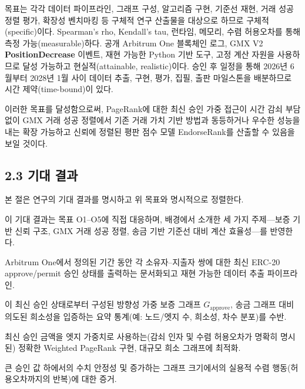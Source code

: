 목표는 각각 데이터 파이프라인, 그래프 구성, 알고리즘 구현, 기준선 재현, 거래 성공 정렬 평가, 확장성 벤치마킹 등 구체적 연구 산출물을 대상으로 하므로 구체적(specific)이다. Spearman's rho, Kendall's tau, 런타임, 메모리, 수렴 허용오차를 통해 측정 가능(measurable)하다. 공개 Arbitrum One 블록체인 로그, GMX V2 \textbf{PositionDecrease} 이벤트, 재현 가능한 Python 기반 도구, 고정 계산 자원을 사용하므로 달성 가능하고 현실적(attainable, realistic)이다. 승인 후 일정을 통해 2026년 6월부터 2028년 1월 사이 데이터 추출, 구현, 평가, 집필, 출판 마일스톤을 배분하므로 시간 제약(time-bound)이 있다.


이러한 목표를 달성함으로써, PageRank에 대한 최신 승인 가중 접근이 시간 감쇠 부담 없이 GMX 거래 성공 정렬에서 기존 거래 가치 기반 방법과 동등하거나 우수한 성능을 내는 확장 가능하고 신뢰에 정렬된 평판 점수 모델 EndorseRank를 산출할 수 있음을 보일 것이다.


\subsection*{2.3 기대 결과}
\label{sec:expected-results}

본 절은 연구의 기대 결과를 명시하고 위 목표와 명시적으로 정렬한다.


이 기대 결과는 목표 O1--O5에 직접 대응하며, 배경에서 소개한 세 가지 주제---보증 기반 신뢰 구조, GMX 거래 성공 정렬, 송금 기반 기준선 대비 계산 효율성---를 반영한다.



Arbitrum One에서 정의된 기간 동안 각 소유자--지출자 쌍에 대한 최신 ERC-20 approve/permit 승인 상태를 출력하는 문서화되고 재현 가능한 데이터 추출 파이프라인.


이 최신 승인 상태로부터 구성된 방향성 가중 보증 그래프 $G_{\text{approve}}$, 송금 그래프 대비 의도된 희소성을 입증하는 요약 통계(예: 노드/엣지 수, 희소성, 차수 분포)를 수반.



최신 승인 금액을 엣지 가중치로 사용하는(감쇠 인자 및 수렴 허용오차가 명확히 명시된) 정확한 Weighted PageRank 구현, 대규모 희소 그래프에 최적화.


큰 승인 값 하에서의 수치 안정성 및 증가하는 그래프 크기에서의 실용적 수렴 행동(허용오차까지의 반복)에 대한 증거.



